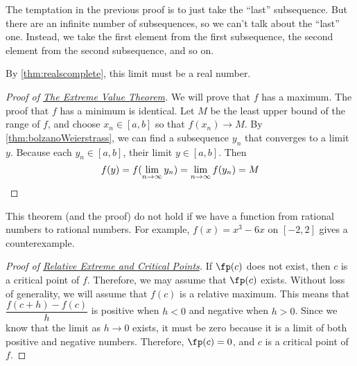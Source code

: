 The temptation in the previous proof is to just take the ``last'' subsequence.  But there are an infinite number of subsequences, so we can't talk about the ``last'' one.  Instead, we take the first element from the first subsequence, the second element from the second subsequence, and so on.

By \autoref{thm:realscomplete}, this limit must be a real number.

\begin{proof}[Proof of {\hyperref[thm:extremeVal]{The Extreme Value Theorem}}]
\label{pf:extremeVal}%
We will prove that $f$ has a maximum.  The proof that $f$ has a minimum is identical.  Let $M$ be the least upper bound of the range of $f$, and choose $x_n\in[a,b]$ so that $f(x_n)\to M$.  By \autoref{thm:bolzanoWeierstrass}, we can find a subsequence $y_n$ that converges to a limit $y$.  Because each $y_n\in[a,b]$, their limit $y\in[a,b]$.  Then
\[
 f(y)=f(\lim_{n\to\infty}y_n)=\lim_{n\to\infty} f(y_n)=M
 \qedhere
\]
\end{proof}

This theorem (and the proof) do not hold if we have a function from rational numbers to rational numbers.  For example, $f(x)=x^3-6x$ on $[-2,2]$ gives a counterexample.

\begin{proof}[Proof of {\hyperref[thm:criticalpts]{Relative Extreme and Critical Points}}]\label{pf:criticalpts}%
If $\fp(c)$ does not exist, then $c$ is a critical point of $f$.  Therefore, we may assume that $\fp(c)$ exists.  Without loss of generality, we will assume that $f(c)$ is a relative maximum.  This means that $\dfrac{f(c+h)-f(c)}h$ is positive when $h<0$ and negative when $h>0$.  Since we know that the limit as $h\to0$ exists, it must be zero because it is a limit of both positive and negative numbers.  Therefore, $\fp(c)=0$, and $c$ is a critical point of $f$.
\end{proof}

